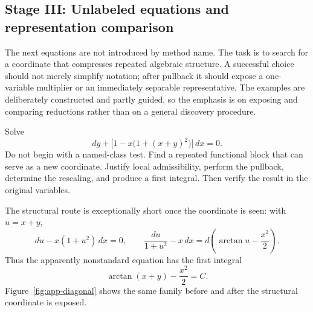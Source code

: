 \documentclass[11pt]{article}
\theoremstyle{definition}
\begin{document}
\subsection{Stage III: Unlabeled equations and representation comparison}

The next equations are not introduced by method name. The task is to search for a coordinate that compresses repeated algebraic structure. A successful choice should not merely simplify notation; after pullback it should expose a one-variable multiplier or an immediately separable representative. The examples are deliberately constructed and partly guided, so the emphasis is on exposing and comparing reductions rather than on a general discovery procedure.

\begin{challengebox}[title={Challenge A.5: a hidden diagonal coordinate}]
Solve
\[
dy+\bigl[1-x\bigl(1+(x+y)^2\bigr)\bigr]\,dx=0.
\]
Do not begin with a named-class test. Find a repeated functional block that can serve as a new coordinate. Justify local admissibility, perform the pullback, determine the rescaling, and produce a first integral. Then verify the result in the original variables.
\end{challengebox}

The structural route is exceptionally short once the coordinate is seen: with $u=x+y$,
\[
du-x(1+u^2)\,dx=0,
\qquad
\frac{du}{1+u^2}-x\,dx
=d\left(\arctan u-\frac{x^2}{2}\right).
\]
Thus the apparently nonstandard equation has the first integral
\[
\arctan(x+y)-\frac{x^2}{2}=C.
\]
Figure~\ref{fig:app-diagonal} shows the same family before and after the structural coordinate is exposed.
\end{document}
